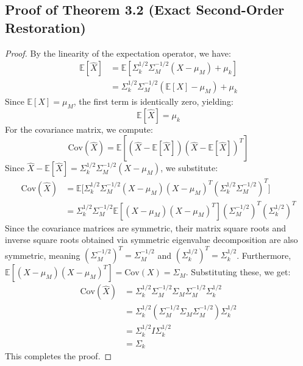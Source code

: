 \documentclass{article}
\theoremstyle{plain}
\theoremstyle{definition}
\theoremstyle{remark}
\begin{document}
\subsection{Proof of Theorem 3.2 (Exact Second-Order Restoration)}
\label{sec:proofs_second_order}
\begin{proof}
  By the linearity of the expectation operator, we have:
  \begin{align*}
    \mathbb{E}[\hat{X}] &= \mathbb{E}\left[\Sigma_k^{1/2} \Sigma_M^{-1/2} (X - \mu_M) + \mu_k\right] \\
    &= \Sigma_k^{1/2} \Sigma_M^{-1/2} (\mathbb{E}[X] - \mu_M) + \mu_k
  \end{align*}
  Since $\mathbb{E}[X] = \mu_M$, the first term is identically zero, yielding:
  \begin{equation}
    \mathbb{E}[\hat{X}] = \mu_k
  \end{equation}
  For the covariance matrix, we compute:
  \begin{equation*}
    \text{Cov}(\hat{X}) = \mathbb{E}\left[(\hat{X} - \mathbb{E}[\hat{X}])(\hat{X} - \mathbb{E}[\hat{X}])^T\right]
  \end{equation*}
  Since $\hat{X} - \mathbb{E}[\hat{X}] = \Sigma_k^{1/2} \Sigma_M^{-1/2} (X - \mu_M)$, we substitute:
  \begin{align*}
    \text{Cov}(\hat{X}) &= \mathbb{E}\Big[\Sigma_k^{1/2} \Sigma_M^{-1/2} (X - \mu_M) (X - \mu_M)^T \left(\Sigma_k^{1/2} \Sigma_M^{-1/2}\right)^T\Big] \\
    &= \Sigma_k^{1/2} \Sigma_M^{-1/2} \mathbb{E}\left[(X - \mu_M) (X - \mu_M)^T\right] \left(\Sigma_M^{-1/2}\right)^T \left(\Sigma_k^{1/2}\right)^T
  \end{align*}
  Since the covariance matrices are symmetric, their matrix square roots and inverse square roots obtained via symmetric eigenvalue decomposition are also symmetric, meaning $\left(\Sigma_M^{-1/2}\right)^T = \Sigma_M^{-1/2}$ and $\left(\Sigma_k^{1/2}\right)^T = \Sigma_k^{1/2}$. Furthermore, $\mathbb{E}\left[(X - \mu_M) (X - \mu_M)^T\right] = \text{Cov}(X) = \Sigma_M$. Substituting these, we get:
  \begin{align*}
    \text{Cov}(\hat{X}) &= \Sigma_k^{1/2} \Sigma_M^{-1/2} \Sigma_M \Sigma_M^{-1/2} \Sigma_k^{1/2} \\
    &= \Sigma_k^{1/2} \left(\Sigma_M^{-1/2} \Sigma_M \Sigma_M^{-1/2}\right) \Sigma_k^{1/2} \\
    &= \Sigma_k^{1/2} I \Sigma_k^{1/2} \\
    &= \Sigma_k
  \end{align*}
  This completes the proof.
\end{proof}
\end{document}
